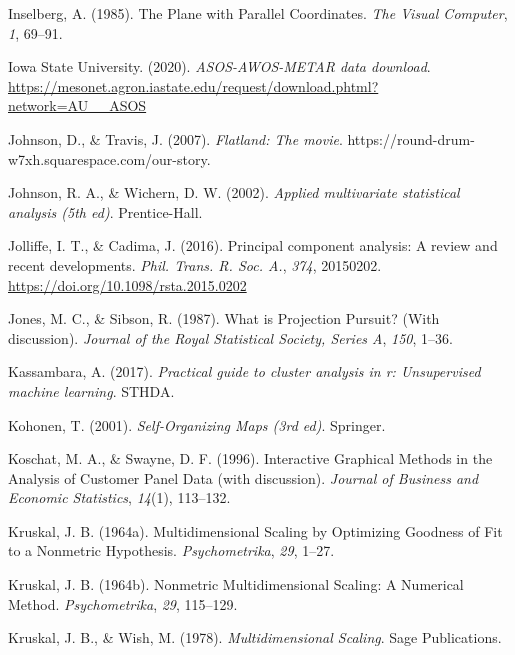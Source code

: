 \documentclass[
  letterpaper,
]{book}
\newlength{\cslhangindent}
\newlength{\cslentryspacingunit} %
\newenvironment{CSLReferences}[2] %
 {%
  \setlength{\parindent}{0pt}
  \ifodd #1
  \let\oldpar\par
  \def\par{\hangindent=\cslhangindent\oldpar}
  \fi
  \setlength{\parskip}{#2\cslentryspacingunit}
 }%
 {}
\begin{document}
\begin{CSLReferences}{1}{0}
\leavevmode{}%
Inselberg, A. (1985). {T}he {P}lane with {P}arallel {C}oordinates.
\emph{The Visual Computer}, \emph{1}, 69--91.

\leavevmode{}%
Iowa State University. (2020). \emph{ASOS-AWOS-METAR data download}.
\url{https://mesonet.agron.iastate.edu/request/download.phtml?network=AU__ASOS}

\leavevmode{}%
Johnson, D., \& Travis, J. (2007). \emph{Flatland: The movie}.
https://round-drum-w7xh.squarespace.com/our-story.

\leavevmode{}%
Johnson, R. A., \& Wichern, D. W. (2002). \emph{Applied multivariate
statistical analysis (5th ed)}. Prentice-Hall.

\leavevmode{}%
Jolliffe, I. T., \& Cadima, J. (2016). Principal component analysis: A
review and recent developments. \emph{Phil. Trans. R. Soc. A.},
\emph{374}, 20150202. \url{https://doi.org/10.1098/rsta.2015.0202}

\leavevmode{}%
Jones, M. C., \& Sibson, R. (1987). {W}hat is {P}rojection {P}ursuit?
(With discussion). \emph{Journal of the Royal Statistical Society,
Series A}, \emph{150}, 1--36.

\leavevmode{}%
Kassambara, A. (2017). \emph{Practical guide to cluster analysis in r:
Unsupervised machine learning}. STHDA.

\leavevmode{}%
Kohonen, T. (2001). \emph{Self-{O}rganizing {M}aps (3rd ed)}. Springer.

\leavevmode{}%
Koschat, M. A., \& Swayne, D. F. (1996). Interactive {G}raphical
{M}ethods in the {A}nalysis of {C}ustomer {P}anel {D}ata (with
discussion). \emph{Journal of Business and Economic Statistics},
\emph{14}(1), 113--132.

\leavevmode{}%
Kruskal, J. B. (1964a). Multidimensional {S}caling by {O}ptimizing
{G}oodness of {F}it to a {N}onmetric {H}ypothesis. \emph{Psychometrika},
\emph{29}, 1--27.

\leavevmode{}%
Kruskal, J. B. (1964b). Nonmetric {M}ultidimensional {S}caling: A
{N}umerical {M}ethod. \emph{Psychometrika}, \emph{29}, 115--129.

\leavevmode{}%
Kruskal, J. B., \& Wish, M. (1978). \emph{Multidimensional {S}caling}.
Sage Publications.


\end{CSLReferences}
\end{document}
